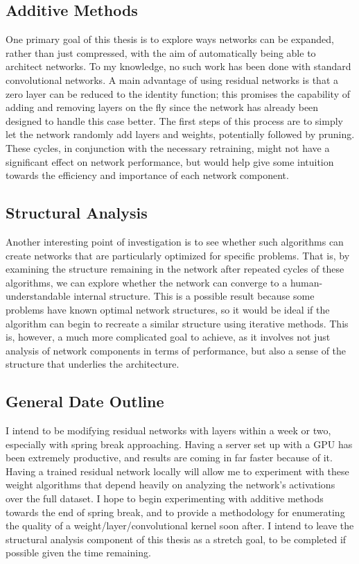 \documentclass[12pt]{article}
\begin{document}
\subsection{Additive Methods}
One primary goal of this thesis is to explore ways networks can be expanded, rather than just compressed, with the aim of automatically being able to architect networks.
To my knowledge, no such work has been done with standard convolutional networks.
A main advantage of using residual networks is that a zero layer can be reduced to the identity function; this promises the capability of adding and removing layers on the fly since the network has already been designed to handle this case better.
The first steps of this process are to simply let the network randomly add layers and weights, potentially followed by pruning.
These cycles, in conjunction with the necessary retraining, might not have a significant effect on network performance, but would help give some intuition towards the efficiency and importance of each network component.

\subsection{Structural Analysis}
Another interesting point of investigation is to see whether such algorithms can create networks that are particularly optimized for specific problems.
That is, by examining the structure remaining in the network after repeated cycles of these algorithms, we can explore whether the network can converge to a human-understandable internal structure.
This is a possible result because some problems have known optimal network structures, so it would be ideal if the algorithm can begin to recreate a similar structure using iterative methods.
This is, however, a much more complicated goal to achieve, as it involves not just analysis of network components in terms of performance, but also a sense of the structure that underlies the architecture.

\subsection{General Date Outline}
I intend to be modifying residual networks with layers within a week or two, especially with spring break approaching.
Having a server set up with a GPU has been extremely productive, and results are coming in far faster because of it.
Having a trained residual network locally will allow me to experiment with these weight algorithms that depend heavily on analyzing the network's activations over the full dataset.
I hope to begin experimenting with additive methods towards the end of spring break, and to provide a methodology for enumerating the quality of a weight/layer/convolutional kernel soon after.
I intend to leave the structural analysis component of this thesis as a stretch goal, to be completed if possible given the time remaining.
\nocite{*}


\end{document}
